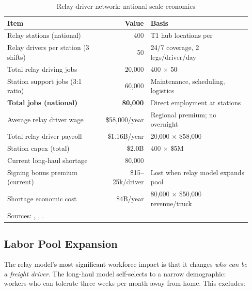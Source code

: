 \begin{table}[h]
\centering
\caption{Relay driver network: national scale economics}
\label{tab:relay_economics}
\begin{tabular}{lrl}
\toprule
Item & Value & Basis \\
\midrule
Relay stations (national)              & 400         & T1 hub locations per \citet{ROUTE_C2} \\
Relay drivers per station (3 shifts)   & 50          & 24/7 coverage, 2 legs/driver/day \\
Total relay driving jobs               & 20,000      & 400 $\times$ 50 \\
Station support jobs (3:1 ratio)       & 60,000      & Maintenance, scheduling, logistics \\
\textbf{Total jobs (national)}         & \textbf{80,000} & Direct employment at stations \\
Average relay driver wage              & \$58,000/year & Regional premium; no overnight \\
Total relay driver payroll             & \$1.16B/year & 20,000 $\times$ \$58,000 \\
Station capex (total)                  & \$2.0B       & 400 $\times$ \$5M \\
\midrule
Current long-haul shortage            & 80,000      & \citet{ATRI_shortage2024} \\
Signing bonus premium (current)        & \$15--25k/driver & Lost when relay model expands pool \\
Shortage economic cost                & \$4B/year   & 80,000 $\times$ \$50,000 revenue/truck \\
\bottomrule
\multicolumn{3}{l}{\footnotesize Sources: \citet{ATRI_shortage2024}, \citet{BLS_trucking2023}, \citet{ROUTE_C2}.} \\
\end{tabular}
\end{table}

\subsection{Labor Pool Expansion}

The relay model's most significant workforce impact is that it changes \textit{who can
be a freight driver}. The long-haul model self-selects to a narrow demographic: workers
who can tolerate three weeks per month away from home. This excludes:

